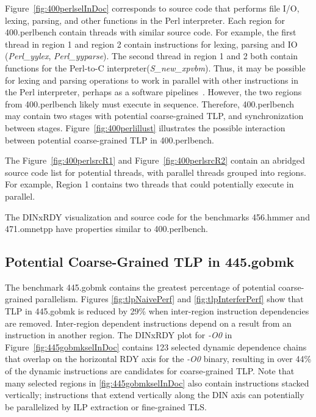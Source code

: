 {Figure~\ref{fig:400perlselInDoc} corresponds to source code that performs file I/O, lexing, parsing, and other functions in the Perl interpreter. Each region for 400.perlbench contain threads with similar source code.  For example, the first thread in region 1 and region 2 contain instructions for lexing, parsing and IO (\textit{Perl\_yylex}, \textit{Perl\_yyparse}).  The second thread in region 1 and 2 both contain functions for the Perl-to-C interpreter(\textit{S\_new\_xpvbm}). Thus, it may be possible for lexing and parsing operations to work in parallel with other instructions in the Perl interpreter, perhaps as a software pipelines~\cite{Allan:1995rt,giacomoni:08:ppopp}. However, the two regions from 400.perlbench likely must execute in sequence. Therefore, 400.perlbench may contain two stages with potential coarse-grained TLP, and synchronization between stages. Figure~\ref{fig:400perlillust} illustrates the possible interaction between potential coarse-grained TLP in 400.perlbench.

The Figure~\ref{fig:400perlsrcR1} and Figure~\ref{fig:400perlsrcR2} contain an abridged source code list for potential threads, with parallel threads grouped into regions.  For example, Region 1 contains two threads that could potentially execute in parallel.

The DINxRDY visualization and source code for the benchmarks 456.hmmer and 471.omnetpp have properties similar to 400.perlbench.

\subsection{Potential Coarse-Grained TLP in 445.gobmk}

The benchmark 445.gobmk contains the greatest percentage of potential coarse-grained parallelism. Figures \ref{fig:tlpNaivePerf} and \ref{fig:tlpInterferPerf} show that TLP in 445.gobmk is reduced by 29\% when inter-region instruction dependencies are removed. Inter-region dependent instructions depend on a result from an instruction in another region.  The DINxRDY plot for \textit{-O0} in Figure~\ref{fig:445gobmkselInDoc} contains 123 selected dynamic dependence chains that overlap on the horizontal RDY axis for the \textit{-O0} binary, resulting in over 44\% of the dynamic instructions are candidates for coarse-grained TLP.  Note that many selected regions in \ref{fig:445gobmkselInDoc} also contain instructions stacked vertically; instructions that extend vertically along the DIN axis can potentially be parallelized by ILP extraction or fine-grained TLS.

}
